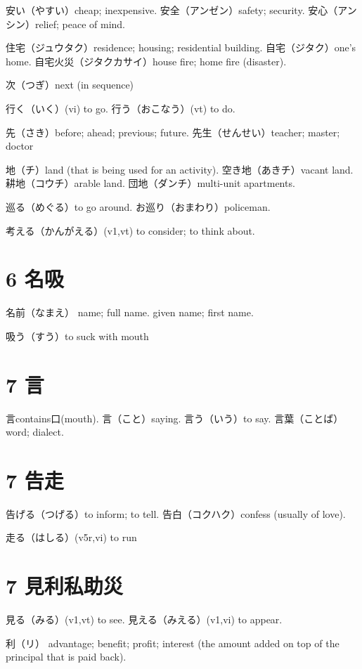 安い（やすい）cheap; inexpensive.
安全（アンゼン）safety; security.
安心（アンシン）relief; peace of mind.

住宅（ジュウタク）residence; housing; residential building.
自宅（ジタク）one's home.
自宅火災（ジタクカサイ）house fire; home fire (disaster).

次（つぎ）next (in sequence)

行く（いく）(vi) to go.
行う（おこなう）(vt) to do.

先（さき）before; ahead; previous; future.
先生（せんせい）teacher; master; doctor

地（チ）land (that is being used for an activity).
空き地（あきチ）vacant land.
耕地（コウチ）arable land.
団地（ダンチ）multi-unit apartments.

巡る（めぐる）to go around.
お巡り（おまわり）policeman.

考える（かんがえる）(v1,vt) to consider; to think about.

\section{6 名吸}

名前（なまえ）
name; full name.
given name; first name.

吸う（すう）to suck with mouth

\section{7 言}

言contains口(mouth).
言（こと）saying.
言う（いう）to say.
言葉（ことば）word; dialect.

\section{7 告走}

告げる（つげる）to inform; to tell.
告白（コクハク）confess (usually of love).

走る（はしる）(v5r,vi) to run

\section{7 見利私助災}

見る（みる）(v1,vt) to see.
見える（みえる）(v1,vi) to appear.

利（リ）
advantage; benefit; profit;
interest (the amount added on top of the principal that is paid back).

